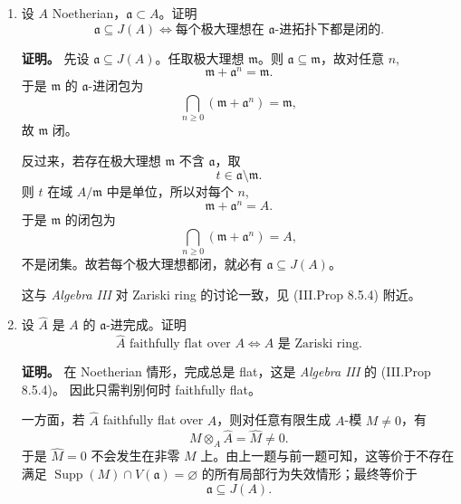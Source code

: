 \documentclass[a4paper]{ctexart}
\begin{document}
\begin{enumerate}[leftmargin=*, label=\textbf{10.\arabic*.}]
\textbf{证明。}
因为 \(x\) 在 \(A\) 中不是零因子，乘法映射
\[
0\to A\xrightarrow{\cdot x} A
\]
单射。把它补成短正合列
\[
0\to A\xrightarrow{\cdot x}A\to A/xA\to 0.
\]
对该短正合列取 \(\mathfrak a\)-进完成。由于 \(A\) Noetherian，有限生成模的完成保持正合，这正是 \textit{Algebra III} 的 (III.Prop 8.5.1)。故得到
\[
0\to \widehat A\xrightarrow{\cdot x}\widehat A\to \widehat{A/xA}\to 0.
\]
第一箭头仍单射，因此 \(x\) 在 \(\widehat A\) 中也不是零因子。

但这并不推出 \(\widehat A\) 一定是整环，因为完成后可能出现新的零因子，它们未必来自原环中的元素。经典例子是
\[
A=k[x,y]_{(x,y)}/(y^2-x^2-x^3).
\]
原环对应局部尖点曲线，仍是整环；但其完成为
\[
k[[x,y]]/(y^2-x^2-x^3).
\]
在 \(k[[x]]\) 中若 \(1+x\) 有平方根，则
\[
y^2-x^2(1+x)=(y-x\sqrt{1+x})(y+x\sqrt{1+x}),
\]
从而完成环分裂，不再是整环。故“整环完成仍整”一般不成立。

\setcounter{enumi}{5}
\item 设 \(A\) Noetherian，\(\mathfrak a\subset A\)。证明
\[
\mathfrak a\subseteq J(A)
\Longleftrightarrow
\text{每个极大理想在 }\mathfrak a\text{-进拓扑下都是闭的}.
\]

\textbf{证明。}
先设 \(\mathfrak a\subseteq J(A)\)。任取极大理想 \(\mathfrak m\)。则 \(\mathfrak a\subseteq \mathfrak m\)，故对任意 \(n\),
\[
\mathfrak m+\mathfrak a^n=\mathfrak m.
\]
于是 \(\mathfrak m\) 的 \(\mathfrak a\)-进闭包为
\[
\bigcap_{n\ge 0}(\mathfrak m+\mathfrak a^n)=\mathfrak m,
\]
故 \(\mathfrak m\) 闭。

反过来，若存在极大理想 \(\mathfrak m\) 不含 \(\mathfrak a\)，取
\[
t\in \mathfrak a\setminus \mathfrak m.
\]
则 \(t\) 在域 \(A/\mathfrak m\) 中是单位，所以对每个 \(n\),
\[
\mathfrak m+\mathfrak a^n=A.
\]
于是 \(\mathfrak m\) 的闭包为
\[
\bigcap_{n\ge 0}(\mathfrak m+\mathfrak a^n)=A,
\]
不是闭集。故若每个极大理想都闭，就必有 \(\mathfrak a\subseteq J(A)\)。

这与 \textit{Algebra III} 对 Zariski ring 的讨论一致，见 (III.Prop 8.5.4) 附近。

\setcounter{enumi}{6}
\item 设 \(\widehat A\) 是 \(A\) 的 \(\mathfrak a\)-进完成。证明
\[
\widehat A \text{ faithfully flat over } A
\Longleftrightarrow
A \text{ 是 Zariski ring}.
\]

\textbf{证明。}
在 Noetherian 情形，完成总是 flat，这是 \textit{Algebra III} 的 (III.Prop 8.5.4)。
因此只需判别何时 faithfully flat。

一方面，若 \(\widehat A\) faithfully flat over \(A\)，则对任意有限生成 \(A\)-模 \(M\neq 0\)，有
\[
M\otimes_A \widehat A=\widehat M\neq 0.
\]
于是 \(\widehat M=0\) 不会发生在非零 \(M\) 上。由上一题与前一题可知，这等价于不存在满足 \(\operatorname{Supp}(M)\cap V(\mathfrak a)=\varnothing\) 的所有局部行为失效情形；最终等价于
\[
\mathfrak a\subseteq J(A).
\]


\end{enumerate}
\end{document}
